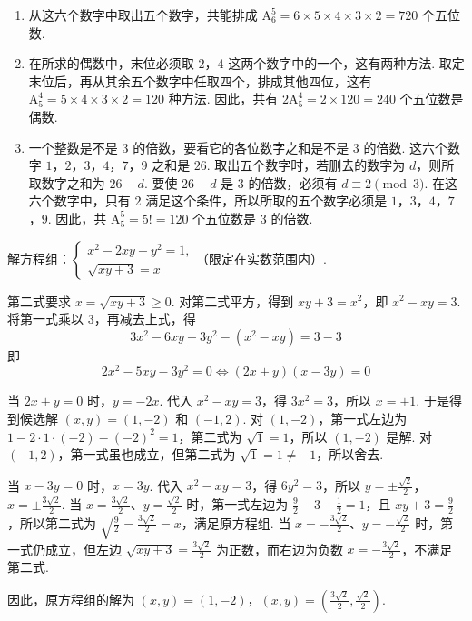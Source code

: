 \documentclass[UTF8,a4paper,oneside,11pt]{ctexbook}
\begin{document}
\begin{solution}
\begin{enumerate}
\item 从这六个数字中取出五个数字，共能排成 \(\mathrm A_6^5=6\times5\times4\times3\times2=720\) 个五位数.

\item 在所求的偶数中，末位必须取 \(2\)，\(4\) 这两个数字中的一个，这有两种方法. 取定末位后，再从其余五个数字中任取四个，排成其他四位，这有 \(\mathrm A_5^4=5\times4\times3\times2=120\) 种方法. 因此，共有 \(2\mathrm A_5^4=2\times120=240\) 个五位数是偶数.

\item 一个整数是不是 \(3\) 的倍数，要看它的各位数字之和是不是 \(3\) 的倍数. 这六个数字 \(1\)，\(2\)，\(3\)，\(4\)，\(7\)，\(9\) 之和是 \(26\). 取出五个数字时，若删去的数字为 \(d\)，则所取数字之和为 \(26-d\). 要使 \(26-d\) 是 \(3\) 的倍数，必须有 \(d\equiv2\pmod3\). 在这六个数字中，只有 \(2\) 满足这个条件，所以所取的五个数字必须是 \(1\)，\(3\)，\(4\)，\(7\)，\(9\). 因此，共 \(\mathrm A_5^5=5!=120\) 个五位数是 \(3\) 的倍数.
\end{enumerate}
\end{solution}

\begin{problem}
解方程组：\(\begin{cases}
x^2-2xy-y^2=1,\\
\sqrt{xy+3}=x
\end{cases}\)（限定在实数范围内）.
\end{problem}

\begin{solution}
第二式要求 \(x=\sqrt{xy+3}\geq0\). 对第二式平方，得到
\(xy+3=x^2\)，即 \(x^2-xy=3\).
将第一式乘以 \(3\)，再减去上式，得
\[
3x^2-6xy-3y^2-(x^2-xy)=3-3
\]
即
\[
2x^2-5xy-3y^2=0
\Longleftrightarrow
\left(2x+y\right)\left(x-3y\right)=0
\]

当 \(2x+y=0\) 时，\(y=-2x\). 代入 \(x^2-xy=3\)，得
\(3x^2=3\)，所以 \(x=\pm1\).
于是得到候选解 \((x,y)=(1,-2)\) 和 \((-1,2)\). 对 \((1,-2)\)，第一式左边为 \(1-2\cdot1\cdot(-2)-(-2)^2=1\)，第二式为 \(\sqrt{1}=1\)，所以 \((1,-2)\) 是解. 对 \((-1,2)\)，第一式虽也成立，但第二式为 \(\sqrt{1}=1\neq-1\)，所以舍去.

当 \(x-3y=0\) 时，\(x=3y\). 代入 \(x^2-xy=3\)，得
\(6y^2=3\)，所以 \(y=\pm\frac{\sqrt2}{2}\)，\(x=\pm\frac{3\sqrt2}{2}\).
当 \(x=\frac{3\sqrt2}{2}\)、\(y=\frac{\sqrt2}{2}\) 时，第一式左边为 \(\frac92-3-\frac12=1\)，且 \(xy+3=\frac92\)，所以第二式为 \(\sqrt{\frac92}=\frac{3\sqrt2}{2}=x\)，满足原方程组. 当 \(x=-\frac{3\sqrt2}{2}\)、\(y=-\frac{\sqrt2}{2}\) 时，第一式仍成立，但左边 \(\sqrt{xy+3}=\frac{3\sqrt2}{2}\) 为正数，而右边为负数 \(x=-\frac{3\sqrt2}{2}\)，不满足第二式.

因此，原方程组的解为
\(\left(x,y\right)=\left(1,-2\right)\)，\(\left(x,y\right)=\left(\frac{3\sqrt2}{2},\frac{\sqrt2}{2}\right)\).
\end{solution}
\end{document}
